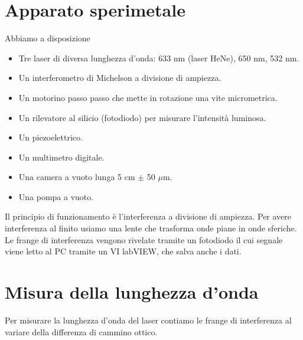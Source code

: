 \documentclass[a4paper]{article}
\begin{document}
\section{Apparato sperimetale}

	Abbiamo a disposizione 
	\begin{itemize}
		\item Tre laser di diversa lunghezza d'onda: 633 nm (laser HeNe), 650 nm, 532 nm.
		\item Un interferometro di Michelson a divisione di ampiezza.
		\item Un motorino passo passo che mette in rotazione una vite micrometrica.
		\item Un rilevatore al silicio (fotodiodo) per misurare l'intensità luminosa.
		\item Un piezoelettrico.
		\item Un multimetro digitale.
		\item Una camera a vuoto lunga 5 cm $\pm$ 50 $\mu$m.
		\item Una pompa a vuoto.
	\end{itemize}
Il principio di funzionamento è l'interferenza a divisione di ampiezza. Per avere interferenza al finito usiamo una lente che trasforma onde piane in onde sferiche. Le frange di interferenza vengono rivelate tramite un fotodiodo il cui segnale viene letto al PC tramite un VI labVIEW, che salva anche i dati.

\section{Misura della lunghezza d'onda}
Per misurare la lunghezza d'onda del laser contiamo le frange di interferenza al variare della differenza di cammino ottico. 
\end{document}
